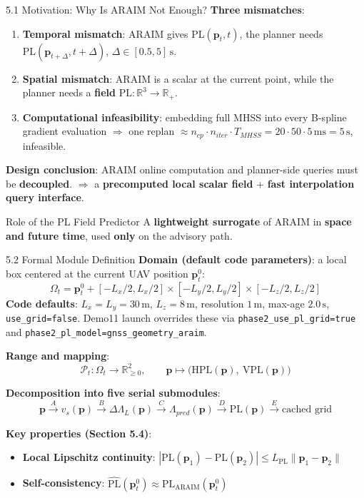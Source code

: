 \documentclass[10pt,aspectratio=169,xcolor=dvipsnames]{beamer}
\newcommand{\PL}{\mathrm{PL}}
\newcommand{\HPL}{\mathrm{HPL}}
\newcommand{\VPL}{\mathrm{VPL}}
\newcommand{\1}{\mathbb{1}}
\newcommand{\R}{\mathbb{R}}
\newcommand{\innov}[1]{\textcolor{NavyBlue}{\textbf{#1}}}
\begin{document}
\begin{frame}{5.1 Motivation: Why Is ARAIM Not Enough?}
  \small
  \textbf{Three mismatches}:

  \begin{enumerate}
    \item \textbf{Temporal mismatch}: ARAIM gives \(\PL(\bm{p}_t,t)\), the planner needs \(\PL(\bm{p}_{t+\Delta},t+\Delta)\), $\Delta\in[0.5,5]\,\si{\second}$.
    \item \textbf{Spatial mismatch}: ARAIM is a scalar at the current point, while the planner needs a \textbf{field} \(\PL:\R^3\to\R_+\).
    \item \textbf{Computational infeasibility}: embedding full MHSS into every B-spline gradient evaluation $\Rightarrow$ one replan $\approx n_{cp}\!\cdot n_{iter}\!\cdot T_{MHSS}\!=\!20\!\cdot\!50\!\cdot\!5\,\si{\milli\second}\!=\!5\,\si{\second}$, infeasible.
  \end{enumerate}

  \medskip
  \textbf{Design conclusion}: ARAIM online computation and planner-side queries must be \textbf{decoupled}.
  $\Rightarrow$ a \textbf{precomputed local scalar field} + \textbf{fast interpolation query interface}.

  \begin{block}{\small Role of the PL Field Predictor}
    \small A \innov{lightweight surrogate} of ARAIM in \textbf{space and future time}, used \textbf{only} on the advisory path.
  \end{block}
\end{frame}

\begin{frame}{5.2 Formal Module Definition}
  \small
  \textbf{Domain (default code parameters)}: a local box centered at the current UAV position $\bm{p}_t^0$:
  \[
    \Omega_t = \bm{p}_t^0 + [-L_x/2,L_x/2]\times[-L_y/2,L_y/2]\times[-L_z/2,L_z/2]
  \]
  \innov{Code defaults}: \(L_x=L_y=30\,\si{\meter}\), \(L_z=8\,\si{\meter}\), resolution \(1\,\si{\meter}\), max-age \(2.0\,\si{\second}\), \texttt{use\_grid=false}. Demo11 launch overrides these via \texttt{phase2\_use\_pl\_grid=true} and \texttt{phase2\_pl\_model=gnss\_geometry\_araim}.

  \medskip
  \textbf{Range and mapping}:
  \[
    \mathcal{P}_t:\Omega_t\to\R_{\ge 0}^2,\qquad
    \bm{p}\mapsto\bigl(\HPL(\bm{p}),\ \VPL(\bm{p})\bigr)
  \]

  \medskip
  \textbf{Decomposition into five serial submodules}:
  \[
    \bm{p}\xrightarrow{A}v_s(\bm{p})\xrightarrow{B}\Delta\Lambda_L(\bm{p})\xrightarrow{C}\Lambda_{pred}(\bm{p})\xrightarrow{D}\PL(\bm{p})\xrightarrow{E}\text{cached grid}
  \]

  \textbf{Key properties (Section 5.4)}:
  \begin{itemize}\scriptsize
    \item \textbf{Local Lipschitz continuity}: $|\PL(\bm{p}_1)-\PL(\bm{p}_2)|\le L_{\PL}\|\bm{p}_1-\bm{p}_2\|$
    \item \textbf{Self-consistency}: $\widehat{\PL}(\bm{p}_t^0)\approx \PL_{\mathrm{ARAIM}}(\bm{p}_t^0)$
  \end{itemize}
\end{frame}
\end{document}
